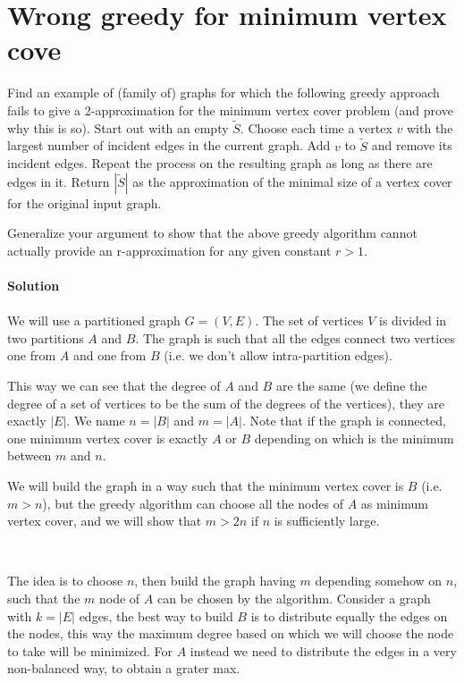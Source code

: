 \documentclass[a4paper]{article}
\begin{document}
\section*{Wrong greedy for minimum vertex cove}
Find an example of (family of) graphs for which the following greedy approach fails to give a 2-approximation for the minimum vertex cover problem (and prove why this is so). 
Start out with an empty $\tilde{S}$.
Choose each time a vertex $v$ with the largest number of incident edges in the current graph.
Add $v$ to $\tilde{S}$ and remove its incident edges.
Repeat the process on the resulting graph as long as there are edges in it.
Return $|\tilde{S}|$ as the approximation of the minimal size of a vertex cover for the original input graph.

Generalize your argument to show that the above greedy algorithm cannot actually provide an r-approximation for any given constant $r > 1$.
\\
\\
\textbf{Solution}
\\
\\
We will use a partitioned graph $G = (V, E)$.
The set of vertices $V$ is divided in two partitions $A$ and $B$.
The graph is such that all the edges connect two vertices one from $A$ and one from $B$ (i.e. we don't allow intra-partition edges).

This way we can see that the degree of $A$ and $B$ are the same (we define the degree of a set of vertices to be the sum of the degrees of the vertices), they are exactly $|E|$.
We name $n = |B|$ and $m = |A|$.
Note that if the graph is connected, one minimum vertex cover is exactly $A$ or $B$ depending on which is the minimum between $m$ and $n$.

We will build the graph in a way such that the minimum vertex cover is $B$ (i.e. $m > n$), but the greedy algorithm can choose all the nodes of $A$ as minimum vertex cover, and we will show that $m > 2n$ if $n$ is sufficiently large.

\

The idea is to choose $n$, then build the graph having $m$ depending somehow on $n$, such that the $m$ node of $A$ can be chosen by the algorithm.
Consider a graph with $k = |E|$ edges, the best way to build $B$ is to distribute equally the edges on the nodes, this way the maximum degree based on which we will choose the node to take will be minimized.
For $A$ instead we need to distribute the edges in a very non-balanced way, to obtain a grater max.
\end{document}
